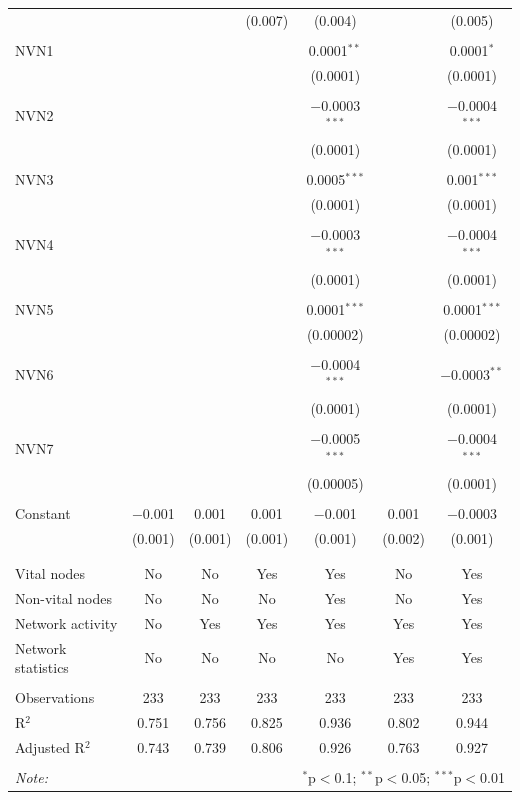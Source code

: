 \begin{table}[!htbp]
\begin{tabular}{@{\extracolsep{5pt}}lcccccc}
  &  &  & (0.007) & (0.004) &  & (0.005) \\ 
  & & & & & & \\ 
 NVN1 &  &  &  & 0.0001$^{**}$ &  & 0.0001$^{*}$ \\ 
  &  &  &  & (0.0001) &  & (0.0001) \\ 
  & & & & & & \\ 
 NVN2 &  &  &  & $-$0.0003$^{***}$ &  & $-$0.0004$^{***}$ \\ 
  &  &  &  & (0.0001) &  & (0.0001) \\ 
  & & & & & & \\ 
 NVN3 &  &  &  & 0.0005$^{***}$ &  & 0.001$^{***}$ \\ 
  &  &  &  & (0.0001) &  & (0.0001) \\ 
  & & & & & & \\ 
 NVN4 &  &  &  & $-$0.0003$^{***}$ &  & $-$0.0004$^{***}$ \\ 
  &  &  &  & (0.0001) &  & (0.0001) \\ 
  & & & & & & \\ 
 NVN5 &  &  &  & 0.0001$^{***}$ &  & 0.0001$^{***}$ \\ 
  &  &  &  & (0.00002) &  & (0.00002) \\ 
  & & & & & & \\ 
 NVN6 &  &  &  & $-$0.0004$^{***}$ &  & $-$0.0003$^{**}$ \\ 
  &  &  &  & (0.0001) &  & (0.0001) \\ 
  & & & & & & \\ 
 NVN7 &  &  &  & $-$0.0005$^{***}$ &  & $-$0.0004$^{***}$ \\ 
  &  &  &  & (0.00005) &  & (0.0001) \\ 
  & & & & & & \\ 
 Constant & $-$0.001 & 0.001 & 0.001 & $-$0.001 & 0.001 & $-$0.0003 \\ 
  & (0.001) & (0.001) & (0.001) & (0.001) & (0.002) & (0.001) \\ 
  & & & & & & \\ 
\hline \\[-1.8ex] 
Vital nodes & No & No & Yes & Yes & No & Yes \\ 
Non-vital nodes & No & No & No & Yes & No & Yes \\ 
Network activity & No & Yes & Yes & Yes & Yes & Yes \\ 
Network statistics & No & No & No & No & Yes & Yes \\ 
\hline &  &  &  &  &  &  \\ 
Observations & 233 & 233 & 233 & 233 & 233 & 233 \\ 
R$^{2}$ & 0.751 & 0.756 & 0.825 & 0.936 & 0.802 & 0.944 \\ 
Adjusted R$^{2}$ & 0.743 & 0.739 & 0.806 & 0.926 & 0.763 & 0.927 \\ 
\hline 
\hline \\[-1.8ex] 
\textit{Note:}  & \multicolumn{6}{r}{$^{*}$p$<$0.1; $^{**}$p$<$0.05; $^{***}$p$<$0.01} \\ 
\end{tabular} 
\end{table} 
